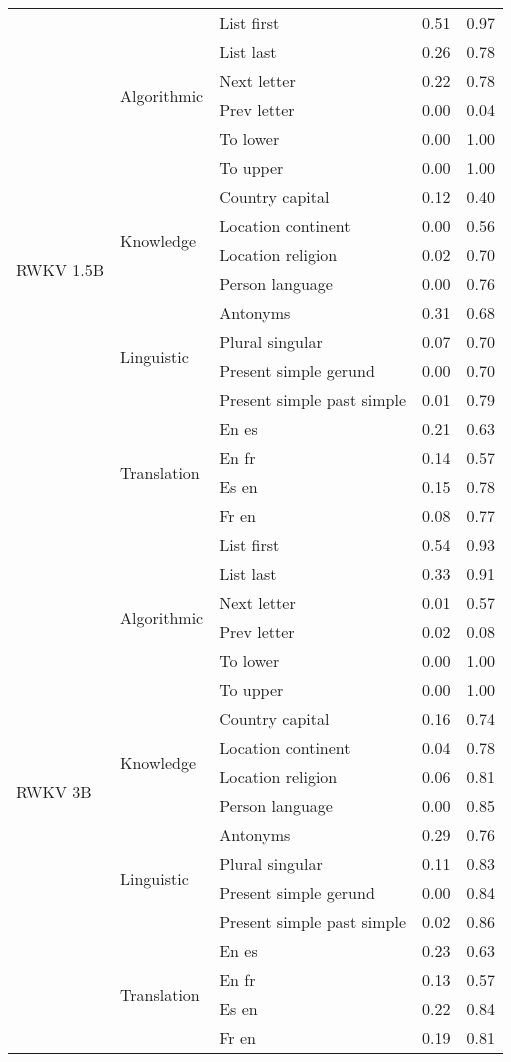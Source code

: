 \begin{center}
\begin{longtable}{lllrr}
\cline{1-5} \cline{2-5}
\multirow[t]{18}{*}{RWKV 1.5B} & \multirow[t]{6}{*}{Algorithmic} & List first & 0.51 & 0.97 \\
 &  & List last & 0.26 & 0.78 \\
 &  & Next letter & 0.22 & 0.78 \\
 &  & Prev letter & 0.00 & 0.04 \\
 &  & To lower & 0.00 & 1.00 \\
 &  & To upper & 0.00 & 1.00 \\
\cline{2-5}
 & \multirow[t]{4}{*}{Knowledge} & Country capital & 0.12 & 0.40 \\
 &  & Location continent & 0.00 & 0.56 \\
 &  & Location religion & 0.02 & 0.70 \\
 &  & Person language & 0.00 & 0.76 \\
\cline{2-5}
 & \multirow[t]{4}{*}{Linguistic} & Antonyms & 0.31 & 0.68 \\
 &  & Plural singular & 0.07 & 0.70 \\
 &  & Present simple gerund & 0.00 & 0.70 \\
 &  & Present simple past simple & 0.01 & 0.79 \\
\cline{2-5}
 & \multirow[t]{4}{*}{Translation} & En es & 0.21 & 0.63 \\
 &  & En fr & 0.14 & 0.57 \\
 &  & Es en & 0.15 & 0.78 \\
 &  & Fr en & 0.08 & 0.77 \\
\cline{1-5} \cline{2-5}
\multirow[t]{18}{*}{RWKV 3B} & \multirow[t]{6}{*}{Algorithmic} & List first & 0.54 & 0.93 \\
 &  & List last & 0.33 & 0.91 \\
 &  & Next letter & 0.01 & 0.57 \\
 &  & Prev letter & 0.02 & 0.08 \\
 &  & To lower & 0.00 & 1.00 \\
 &  & To upper & 0.00 & 1.00 \\
\cline{2-5}
 & \multirow[t]{4}{*}{Knowledge} & Country capital & 0.16 & 0.74 \\
 &  & Location continent & 0.04 & 0.78 \\
 &  & Location religion & 0.06 & 0.81 \\
 &  & Person language & 0.00 & 0.85 \\
\cline{2-5}
 & \multirow[t]{4}{*}{Linguistic} & Antonyms & 0.29 & 0.76 \\
 &  & Plural singular & 0.11 & 0.83 \\
 &  & Present simple gerund & 0.00 & 0.84 \\
 &  & Present simple past simple & 0.02 & 0.86 \\
\cline{2-5}
 & \multirow[t]{4}{*}{Translation} & En es & 0.23 & 0.63 \\
 &  & En fr & 0.13 & 0.57 \\
 &  & Es en & 0.22 & 0.84 \\
 &  & Fr en & 0.19 & 0.81 \\
\cline{1-5} \cline{2-5}
\bottomrule
\end{longtable}

\end{center}
\twocolumn